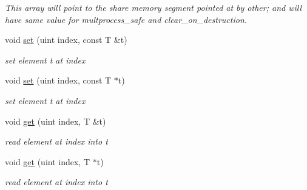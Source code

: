 \begin{DoxyCompactItemize}
\begin{DoxyCompactList}\small\item\em This array will point to the share memory segment pointed at by other; and will have same value for multprocess\+\_\+safe and clear\+\_\+on\+\_\+destruction. \end{DoxyCompactList}\item 
\mbox{\label{classshared__memory_1_1array_ac413bc76d199bb52a0f95faff7222f37}} 
void \hyperlink{classshared__memory_1_1array_ac413bc76d199bb52a0f95faff7222f37}{set} (uint index, const T \&t)
\begin{DoxyCompactList}\small\item\em set element t at index \end{DoxyCompactList}\item 
\mbox{\label{classshared__memory_1_1array_ae581f4ffcf1e543032e0128be5da181d}} 
void \hyperlink{classshared__memory_1_1array_ae581f4ffcf1e543032e0128be5da181d}{set} (uint index, const T $\ast$t)
\begin{DoxyCompactList}\small\item\em set element t at index \end{DoxyCompactList}\item 
\mbox{\label{classshared__memory_1_1array_ae16ed72c9590631e608de8bacf1368ba}} 
void \hyperlink{classshared__memory_1_1array_ae16ed72c9590631e608de8bacf1368ba}{get} (uint index, T \&t)
\begin{DoxyCompactList}\small\item\em read element at index into t \end{DoxyCompactList}\item 
\mbox{\label{classshared__memory_1_1array_ad700d5874d92def07f77f4da7f31f980}} 
void \hyperlink{classshared__memory_1_1array_ad700d5874d92def07f77f4da7f31f980}{get} (uint index, T $\ast$t)
\begin{DoxyCompactList}\small\item\em read element at index into t \end{DoxyCompactList}\item 
\mbox{\label{classshared__memory_1_1array_ad6019f83449e4ea8d1bf4bd0d48c29b0}} 

\end{DoxyCompactItemize}
